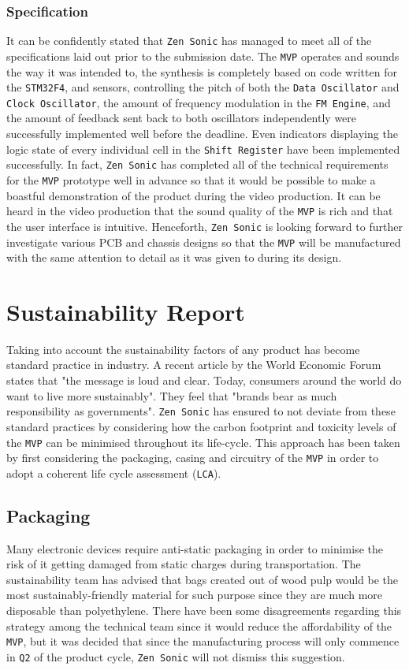 \documentclass[12pt]{article}
\begin{document}
\subsubsection{Specification}
It can be confidently stated that \texttt{Zen Sonic} has managed to meet all of the specifications laid out prior to the submission date. The \texttt{MVP} operates and sounds the way it was intended to, the synthesis is completely based on code written for the \texttt{STM32F4}, and sensors, controlling the pitch of both the \texttt{Data Oscillator} and \texttt{Clock Oscillator}, the amount of frequency modulation in the \texttt{FM Engine}, and the amount of feedback sent back to both oscillators independently were successfully implemented well before the deadline. Even indicators displaying the logic state of every individual cell in the \texttt{Shift Register} have been implemented successfully. In fact, \texttt{Zen Sonic} has completed all of the technical requirements for the \texttt{MVP} prototype well in advance so that it would be possible to make a boastful demonstration of the product during the video production. It can be heard in the video production that the sound quality of the \texttt{MVP} is rich and that the user interface is intuitive. Henceforth, \texttt{Zen Sonic} is looking forward to further investigate various PCB and chassis designs so that the \texttt{MVP} will be manufactured with the same attention to detail as it was given to during its design.
\section{Sustainability Report}
Taking into account the sustainability factors of any product has become standard practice in industry. A recent article by the World Economic Forum states that "the message is loud and clear. Today, consumers around the world do want to live more sustainably"\cite{WEF}. They feel that "brands bear as much responsibility as governments". \texttt{Zen Sonic} has ensured to not deviate from these standard practices by considering how the carbon footprint and toxicity levels of the \texttt{MVP} can be minimised throughout its life-cycle. This approach has been taken by first considering the packaging, casing and circuitry of the \texttt{MVP} in order to adopt a coherent life cycle assessment (\texttt{LCA}).
\subsection{Packaging}
Many electronic devices require anti-static packaging in order to minimise the risk of it getting damaged from static charges during transportation. The sustainability team has advised that bags created out of wood pulp would be the most sustainably-friendly material for such purpose since they are much more disposable than polyethylene\cite{PULP}. There have been some disagreements regarding this strategy among the technical team since it would reduce the affordability of the \texttt{MVP}, but it was decided that since the manufacturing process will only commence in \texttt{Q2} of the product cycle, \texttt{Zen Sonic} will not dismiss this suggestion.  
\end{document}
